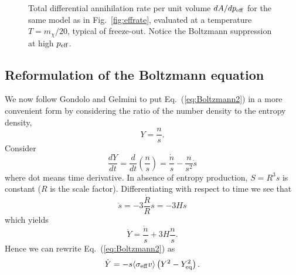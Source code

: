 \begin{figure}
  \centerline{}
  \caption{Total differential annihilation rate per unit volume 
    $dA/dp_{\rm eff}$ for the same model as in
    Fig.~\protect\ref{fig:effrate}, evaluated at a temperature
    $T=m_\chi/20$, typical of freeze-out. Notice the Boltzmann
    suppression at high $p_{\rm eff}$.}
  \label{fig:k1effrate}
\end{figure}



\subsection{Reformulation of the Boltzmann equation}

We now follow Gondolo and Gelmini \cite{Gondolo:1990dk} to 
put Eq.~(\ref{eq:Boltzmann2}) in a more convenient form by
considering the ratio of the number density to the entropy density,
\begin{equation} \label{eq:ydef}
  Y = \frac{n}{s}.
\end{equation}
Consider
\begin{equation}
  \frac{dY}{dt} = \frac{d}{dt} \left( \frac{n}{s} \right) = 
  \frac{\dot{n}}{s}-\frac{n}{s^2}\dot{s}
\end{equation}
where dot means time derivative. In absence
of entropy production, $S=R^3s$ is constant ($R$ is the scale factor).
Differentiating with respect to time we see 
that
\begin{equation}
  \dot{s} = -3\frac{\dot{R}}{R} s = -3Hs
\label{eq:entropycons}
\end{equation}
which yields
\begin{equation}
  \dot{Y} = \frac{\dot{n}}{s} + 3H \frac{n}{s}.
\end{equation}
Hence we can rewrite Eq.~(\ref{eq:Boltzmann2}) as
\begin{equation} \label{eq:Boltzmann3}
  \dot{Y} = -s  \langle \sigma_{\rm{eff}} v \rangle 
  \left( Y^2 - Y_{\rm{eq}}^2 \right).
\end{equation}

